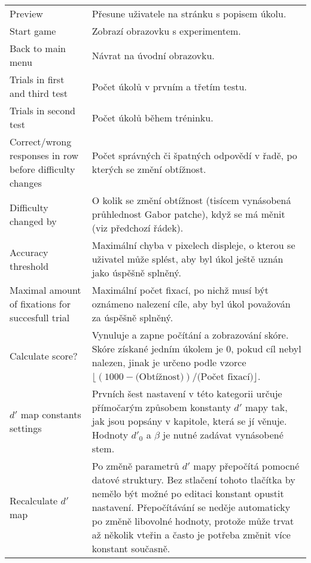 {\begin{longtable}{p{}p{}}
Preview & Přesune uživatele na stránku s popisem úkolu. \\ 

Start game & Zobrazí obrazovku s experimentem. \\

Back to main menu & Návrat na úvodní obrazovku. \\

Trials in first and third test & Počet úkolů  v prvním a třetím testu. \\

Trials in second test & Počet úkolů během tréninku. \\

Correct/wrong responses in row before difficulty changes & Počet správných či
špatných odpovědí v řadě, po kterých se změní obtížnost. \\

Difficulty changed by & O kolik se změní obtížnost (tisícem vynásobená
průhlednost Gabor patche), když se má měnit (viz předchozí řádek). \\

Accuracy threshold & Maximální chyba v pixelech displeje, o kterou se uživatel
může splést, aby byl úkol ještě uznán jako úspěšně splněný. \\

Maximal amount of fixations for succesfull trial & Maximální počet fixací, po
nichž musí být oznámeno nalezení cíle, aby byl úkol považován za úspěšně
splněný. \\

Calculate score? & Vynuluje a zapne počítání a zobrazování skóre. Skóre získané
jedním úkolem je 0, pokud cíl nebyl nalezen, jinak je určeno podle vzorce
$\lfloor(1000 - \text{(Obtížnost)})/\text{(Počet fixací)}\rfloor$. \\

$d'$ map constants settings & Prvních šest nastavení v této kategorii určuje
přímočarým způsobem konstanty $d'$ mapy tak, jak jsou popsány v kapitole, která
se jí věnuje. Hodnoty $d'_0$ a $\beta$ je nutné zadávat vynásobené stem. \\

Recalculate $d'$ map & Po změně parametrů $d'$ mapy přepočítá pomocné datové
struktury. Bez stlačení tohoto tlačítka by nemělo být možné po editaci konstant
opustit nastavení. Přepočítávání se neděje automaticky po změně libovolné
hodnoty, protože může trvat až několik vteřin a často je potřeba změnit více
konstant současně. \\


\end{longtable}}
